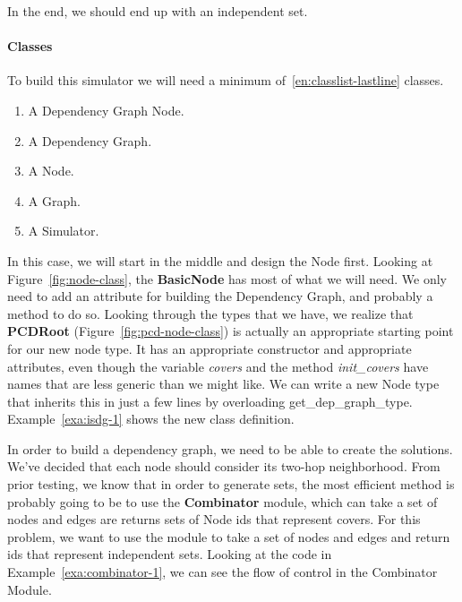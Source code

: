 

In the end, we should end up with an independent set.

\paragraph{Classes}

To build this simulator we will need a minimum of~\ref{en:classlist-lastline} classes.
\begin{enumerate}
\item A Dependency Graph Node.
\item A Dependency Graph.
\item A Node.
\item A Graph.
\item A Simulator.\label{en:classlist-lastline}
\end{enumerate}

In this case, we will start in the middle and design the Node first. Looking at Figure~\ref{fig:node-class}, the {\bfseries BasicNode} has most of what we will need. We only need to add an attribute for building the Dependency Graph, and probably a method to do so. Looking through the types that we have, we realize that {\bfseries PCDRoot} (Figure~\ref{fig:pcd-node-class}) is actually an appropriate starting point for our new node type. It has an appropriate constructor and appropriate attributes, even though the variable {\em covers} and the method {\em init\_covers} have names that are less generic than we might like. We can write a new Node type that inherits this in just a few lines by overloading {\ttfamily get\_dep\_graph\_type}. Example~\ref{exa:isdg-1} shows the new class definition.



In order to build a dependency graph, we need to be able to create the solutions. We've decided that each node should consider its two-hop neighborhood. From prior testing, we know that in order to generate sets, the most efficient method is probably going to be to use the {\bfseries Combinator} module, which can take a set of nodes and edges are returns sets of Node ids that represent covers. For this problem, we want to use the module to take a set of nodes and edges and return ids that represent independent sets. Looking at the code in Example~\ref{exa:combinator-1}, we can see the flow of control in the Combinator Module. 



